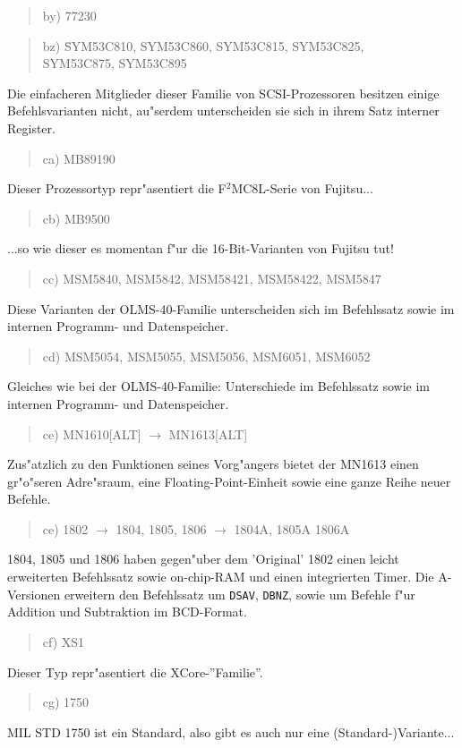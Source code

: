 \documentclass[12pt,a4paper,twoside]{report}
\newcommand{\tty}[1]{{\tt #1}}
\begin{document}
\begin{quote}
by) 77230
\end{quote}
\begin{quote}
\begin{tabbing}
bz) \= SYM53C810, SYM53C860, SYM53C815, SYM53C825, \\
    \> SYM53C875, SYM53C895
\end{tabbing}
\end{quote}
Die einfacheren Mitglieder dieser Familie von SCSI-Prozessoren besitzen
einige Befehlsvarianten nicht, au"serdem unterscheiden sie sich in ihrem
Satz interner Register.
\begin{quote}
ca) MB89190
\end{quote}
Dieser Prozessortyp repr"asentiert die F$^{2}$MC8L-Serie von Fujitsu...
\begin{quote}
cb) MB9500
\end{quote}
...so wie dieser es momentan f"ur die 16-Bit-Varianten von Fujitsu tut!
\begin{quote}
cc) MSM5840, MSM5842, MSM58421, MSM58422, MSM5847
\end{quote}
Diese Varianten der OLMS-40-Familie unterscheiden sich im
Befehlssatz sowie im internen Programm- und Datenspeicher.
\begin{quote}
cd) MSM5054, MSM5055, MSM5056, MSM6051, MSM6052
\end{quote}
Gleiches wie bei der OLMS-40-Familie: Unterschiede im
Befehlssatz sowie im internen Programm- und Datenspeicher.
\begin{quote}
ce) MN1610[ALT] $\rightarrow$ MN1613[ALT]
\end{quote}
Zus"atzlich zu den Funktionen seines Vorg"angers bietet der
MN1613 einen gr"o"seren Adre"sraum, eine Floating-Point-Einheit
sowie eine ganze Reihe neuer Befehle.
\begin{quote}
ce) 1802 $\rightarrow$ 1804, 1805, 1806 $\rightarrow$ 1804A, 1805A
1806A
\end{quote}
1804, 1805 und 1806 haben gegen"uber dem 'Original' 1802 einen leicht
erweiterten Befehlssatz sowie on-chip-RAM und einen integrierten
Timer.  Die A-Versionen erweitern den Befehlssatz um \tty{DSAV},
\tty{DBNZ}, sowie um Befehle f"ur Addition und Subtraktion im
BCD-Format.
\begin{quote}
cf) XS1
\end{quote}
Dieser Typ repr"asentiert die XCore-''Familie''.
\begin{quote}
cg) 1750
\end{quote}
MIL STD 1750 ist ein Standard, also gibt es auch nur eine
(Standard-)Variante...
\end{document}
